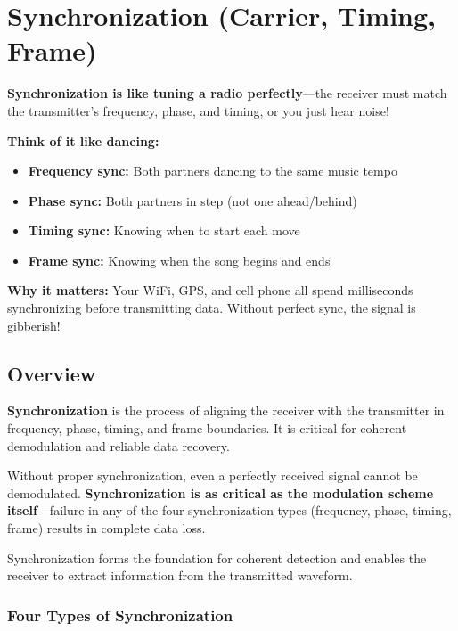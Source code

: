 \chapter{Synchronization (Carrier, Timing, Frame)}
\label{ch:synchronization}

\begin{nontechnical}
\textbf{Synchronization is like tuning a radio perfectly}---the receiver must match the transmitter's frequency, phase, and timing, or you just hear noise!

\textbf{Think of it like dancing:}
\begin{itemize}
\item \textbf{Frequency sync:} Both partners dancing to the same music tempo
\item \textbf{Phase sync:} Both partners in step (not one ahead/behind)
\item \textbf{Timing sync:} Knowing when to start each move
\item \textbf{Frame sync:} Knowing when the song begins and ends
\end{itemize}

\textbf{Why it matters:} Your WiFi, GPS, and cell phone all spend milliseconds synchronizing before transmitting data. Without perfect sync, the signal is gibberish!
\end{nontechnical}

\section{Overview}

\textbf{Synchronization} is the process of aligning the receiver with the transmitter in frequency, phase, timing, and frame boundaries. It is critical for coherent demodulation and reliable data recovery.

\begin{keyconcept}
Without proper synchronization, even a perfectly received signal cannot be demodulated. \textbf{Synchronization is as critical as the modulation scheme itself}---failure in any of the four synchronization types (frequency, phase, timing, frame) results in complete data loss.
\end{keyconcept}

Synchronization forms the foundation for coherent detection and enables the receiver to extract information from the transmitted waveform.

\subsection{Four Types of Synchronization}


